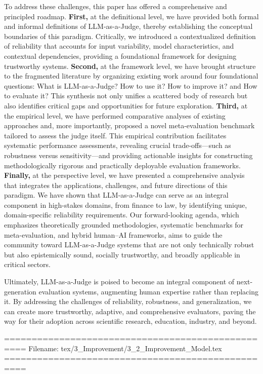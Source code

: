 To address these challenges, this paper has offered a comprehensive and principled roadmap. \textbf{First,} at the definitional level, we have provided both formal and informal definitions of LLM-as-a-Judge, thereby establishing the conceptual boundaries of this paradigm. Critically, we introduced a contextualized definition of reliability that accounts for input variability, model characteristics, and contextual dependencies, providing a foundational framework for designing trustworthy systems. \textbf{Second,} at the framework level, we have brought structure to the fragmented literature by organizing existing work around four foundational questions: What is LLM-as-a-Judge? How to use it? How to improve it? and How to evaluate it? This synthesis not only unifies a scattered body of research but also identifies critical gaps and opportunities for future exploration. \textbf{Third, }at the empirical level, we have performed comparative analyses of existing approaches and, more importantly, proposed a novel meta-evaluation benchmark tailored to assess the judge itself. This empirical contribution facilitates systematic performance assessments, revealing crucial trade-offs—such as robustness versus sensitivity—and providing actionable insights for constructing methodologically rigorous and practically deployable evaluation frameworks. \textbf{Finally, }at the perspective level, we have presented a comprehensive analysis that integrates the applications, challenges, and future directions of this paradigm. We have shown that LLM-as-a-Judge can serve as an integral component in high-stakes domains, from finance to law, by identifying unique, domain-specific reliability requirements. Our forward-looking agenda, which emphasizes theoretically grounded methodologies, systematic benchmarks for meta-evaluation, and hybrid human–AI frameworks, aims to guide the community toward LLM-as-a-Judge systems that are not only technically robust but also epistemically sound, socially trustworthy, and broadly applicable in critical sectors.

Ultimately, LLM-as-a-Judge is poised to become an integral component of next-generation evaluation systems, augmenting human expertise rather than replacing it. By addressing the challenges of reliability, robustness, and generalization, we can create more trustworthy, adaptive, and comprehensive evaluators, paving the way for their adoption across scientific research, education, industry, and beyond.




==================================================
Filename: tex/3_Improvement/3_2_Improvement_Model.tex
==================================================
